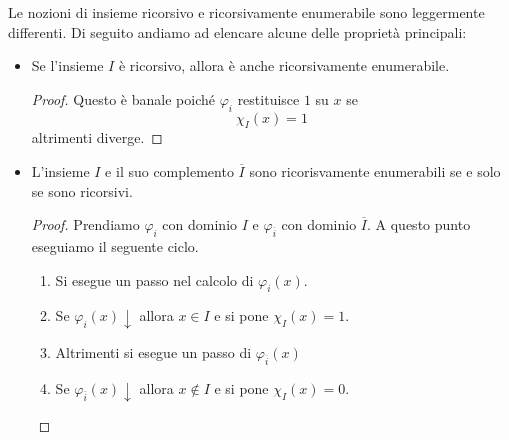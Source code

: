 Le nozioni di insieme ricorsivo e ricorsivamente enumerabile
sono leggermente differenti. Di seguito andiamo ad elencare
alcune delle proprietà principali:
\begin{itemize}
	\item Se l'insieme $I$ è ricorsivo, allora è anche
	      ricorsivamente enumerabile.
	      \begin{proof}
		      Questo è banale poiché $\varphi_i$ restituisce
		      $1$ su $x$ se
		      \[ \chi_I (x) = 1 \]
		      altrimenti diverge.
	      \end{proof}
	\item L'insieme $I$ e il suo complemento $\overline{I}$
	      sono ricorisvamente enumerabili se e solo se sono
	      ricorsivi.
	      \begin{proof}
		      Prendiamo $\varphi_i$ con dominio $I$ e
		      $\varphi_{\overline{i}}$ con dominio
		      $\overline{I}$. A questo punto eseguiamo il
		      seguente ciclo.
		      \begin{enumerate}
			      \item Si esegue un passo nel calcolo di
			            $\varphi_i(x)$.
			      \item Se $\varphi_i(x) \downarrow$ allora
			            $x \in I$ e si pone $\chi_I(x) = 1$.
			      \item Altrimenti si esegue un passo di
			            $\varphi_{\overline{i}}(x)$
			      \item Se $\varphi_{\overline{i}}(x) \downarrow$
			            allora $x \notin I$ e si pone
			            $\chi_I(x) = 0$.
		      \end{enumerate}
	      \end{proof}
\end{itemize}

